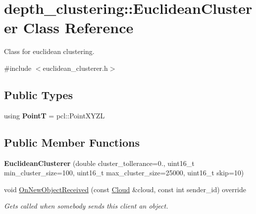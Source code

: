 \hypertarget{classdepth__clustering_1_1EuclideanClusterer}{\section{depth\-\_\-clustering\-:\-:Euclidean\-Clusterer Class Reference}
\label{classdepth__clustering_1_1EuclideanClusterer}
}


Class for euclidean clustering.  




{\ttfamily \#include $<$euclidean\-\_\-clusterer.\-h$>$}

\subsection*{Public Types}
\begin{DoxyCompactItemize}
\item 
\hypertarget{classdepth__clustering_1_1EuclideanClusterer_a7c8df2531faab16c7156087cd62d31ca}{using {\bfseries Point\-T} = pcl\-::\-Point\-X\-Y\-Z\-L}\label{classdepth__clustering_1_1EuclideanClusterer_a7c8df2531faab16c7156087cd62d31ca}

\end{DoxyCompactItemize}
\subsection*{Public Member Functions}
\begin{DoxyCompactItemize}
\item 
\hypertarget{classdepth__clustering_1_1EuclideanClusterer_a1c8b10d1977bf4c1f463d2f1942526df}{{\bfseries Euclidean\-Clusterer} (double cluster\-\_\-tollerance=0., uint16\-\_\-t min\-\_\-cluster\-\_\-size=100, uint16\-\_\-t max\-\_\-cluster\-\_\-size=25000, uint16\-\_\-t skip=10)}\label{classdepth__clustering_1_1EuclideanClusterer_a1c8b10d1977bf4c1f463d2f1942526df}

\item 
void \hyperlink{classdepth__clustering_1_1EuclideanClusterer_a8ebdd098c514a05f17f16070255b27a6}{On\-New\-Object\-Received} (const \hyperlink{classdepth__clustering_1_1Cloud}{Cloud} \&cloud, const int sender\-\_\-id) override
\begin{DoxyCompactList}\small\item\em Gets called when somebody sends this client an object. \end{DoxyCompactList}\end{DoxyCompactItemize}
